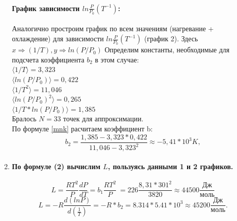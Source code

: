 \documentclass[a4paper,12pt]{article}
\begin{document}
\begin{enumerate}
\paragraph{График зависимости $ln\frac{P}{P_0}(T^{-1})$:} 
Аналогично простроим график по всем значениям (нагревание + охлаждение) для зависимости $ln\frac{P}{P_0}(T^{-1})$ (график 2). Здесь $x\Rightarrow(1/T), y\Rightarrow ln(P/P_0) $ Определим константы, необходимые для подсчета коэффициента $b_2$ в этом случае:\\
$\langle 1/T \rangle = 3,323$\\ 
$\langle ln(P/P_0) \rangle = 0,422$\\
$\langle 1/T^2 \rangle = 11,046$\\
$\langle ln(P/P_0)^2 \rangle = 0,265$\\
$\langle 1/T*ln(P/P_0) \rangle = 1,385$\\
Бралось $ N = 33$ точек для аппроксимации. \\
По формуле \ref{mnk} расчитаем коэффициент b:
\[b_2 = \frac{1,385-3,323*0,422}{11,046 - 3,323^2}\approx -5,41 * 10^3 K,\]
\begin{figure}[h]
\label{plot_2}
\end{figure}
\item
\paragraph{ По формуле (2) вычислим $L$, пользуясь данными 1 и 2 графиков.}
\[L=\frac{ RT^2}{P}\frac{dP}{dT} = b_1\frac{RT^2}{P}\ = 226\frac{8,31*301^2}{3820}\approx 44500\frac{\text{Дж}}{\text{моль}}\]
\[L = - R\frac{d(lnP)}{d(\frac{1}{T})} = - R*b_2 = 8.314 * 5.41 * 10^3 \approx 45200 \frac{\text{Дж}}{\text{моль}}.\]

\end{enumerate}
\end{document}
